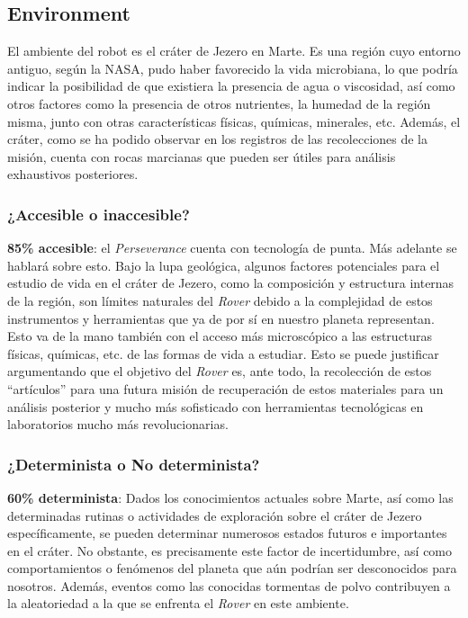 \documentclass[12pt, letterpaper]{article}
\begin{document}
    \subsection{Environment}\label{environment}

    El ambiente del robot es el cráter de Jezero en Marte. Es una región cuyo entorno antiguo, según la NASA, pudo haber favorecido la vida microbiana, lo que podría indicar la posibilidad de que existiera la presencia de agua o viscosidad, así como otros factores como la presencia de otros nutrientes, la humedad de la región misma, junto con otras características físicas, químicas, minerales, etc. Además, el cráter, como se ha podido observar en los registros de las recolecciones de la misión, cuenta con rocas marcianas que pueden ser útiles para análisis exhaustivos posteriores.
    
        \subsubsection{¿Accesible o inaccesible?}

        \textbf{85\% accesible}: el \textit{Perseverance} cuenta con tecnología de punta. Más adelante se hablará sobre esto. Bajo la lupa geológica, algunos factores potenciales para el estudio de vida en el cráter de Jezero, como la composición y estructura internas de la región, son límites naturales del \textit{Rover} debido a la complejidad de estos instrumentos y herramientas que ya de por sí en nuestro planeta representan. Esto va de la mano también con el acceso más microscópico a las estructuras físicas, químicas, etc. de las formas de vida a estudiar. Esto se puede justificar argumentando que el objetivo del \textit{Rover} es, ante todo, la recolección de estos “artículos” para una futura misión de recuperación de estos materiales para un análisis posterior y mucho más sofisticado con herramientas tecnológicas en laboratorios mucho más revolucionarias.
    
        \subsubsection{¿Determinista o No determinista?}

        \textbf{60\% determinista}: Dados los conocimientos actuales sobre Marte, así como las determinadas rutinas o actividades de exploración sobre el cráter de Jezero específicamente, se pueden determinar numerosos estados futuros e importantes en el cráter. No obstante, es precisamente este factor de incertidumbre, así como comportamientos o fenómenos del planeta que aún podrían ser desconocidos para nosotros\cite{pardo2020geologia}. Además, eventos como las conocidas tormentas de polvo contribuyen a la aleatoriedad a la que se enfrenta el \textit{Rover} en este ambiente.
        
\end{document}

